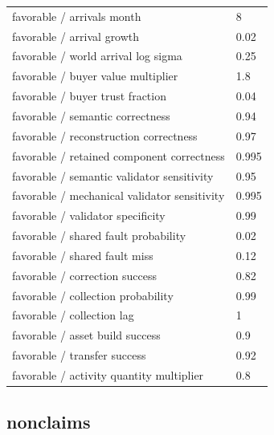 \documentclass[10pt]{article}
\begin{document}
\begin{longtable}{p{.44\linewidth}p{.50\linewidth}}
favorable / arrivals month & 8\\

favorable / arrival growth & 0.02\\

favorable / world arrival log sigma & 0.25\\

favorable / buyer value multiplier & 1.8\\

favorable / buyer trust fraction & 0.04\\

favorable / semantic correctness & 0.94\\

favorable / reconstruction correctness & 0.97\\

favorable / retained component correctness & 0.995\\

favorable / semantic validator sensitivity & 0.95\\

favorable / mechanical validator sensitivity & 0.995\\

favorable / validator specificity & 0.99\\

favorable / shared fault probability & 0.02\\

favorable / shared fault miss & 0.12\\

favorable / correction success & 0.82\\

favorable / collection probability & 0.99\\

favorable / collection lag & 1\\

favorable / asset build success & 0.9\\

favorable / transfer success & 0.92\\

favorable / activity quantity multiplier & 0.8\\

\bottomrule\end{longtable}

\subsection*{nonclaims}
\end{document}
